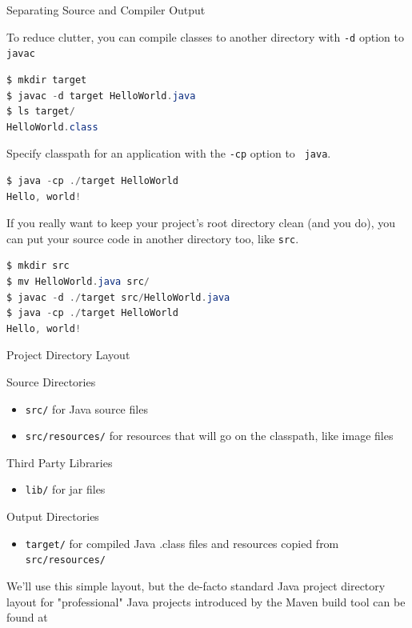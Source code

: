 \documentclass{beamer}
\begin{document}
\begin{frame}[fragile]{Separating Source and Compiler Output}


To reduce clutter, you can compile classes to another directory with {\tt -d} option to {\tt javac}
\begin{lstlisting}[language=Java]
$ mkdir target
$ javac -d target HelloWorld.java
$ ls target/
HelloWorld.class
\end{lstlisting}
Specify classpath for an application with the {\tt -cp} option to {\tt
  java}.
\begin{lstlisting}[language=Java]
$ java -cp ./target HelloWorld
Hello, world!
\end{lstlisting}

If you really want to keep your project's root directory clean (and you do), you can put your source code in another directory too, like {\tt src}.
\begin{lstlisting}[language=Java]
$ mkdir src
$ mv HelloWorld.java src/
$ javac -d ./target src/HelloWorld.java
$ java -cp ./target HelloWorld
Hello, world!
\end{lstlisting}

\end{frame}

\begin{frame}[fragile]{Project Directory Layout}


Source Directories
\begin{itemize}
\item {\tt src/} for Java source files
\item {\tt src/resources/} for resources that will go on the classpath, like image files
\end{itemize}

Third Party Libraries
\begin{itemize}
\item {\tt lib/} for jar files
\end{itemize}


Output Directories
\begin{itemize}
\item {\tt target/} for compiled Java .class files and resources copied from {\tt src/resources/}
\end{itemize}

We'll use this simple layout, but the de-facto standard Java project directory layout for "professional" Java projects introduced by the Maven build tool can be found at 

\end{frame}
\end{document}
